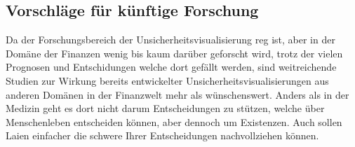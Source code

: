 \subsection{Vorschläge für künftige Forschung}

Da der Forschungsbereich der Unsicherheitsvisualisierung reg ist, aber in der Domäne der Finanzen wenig bis kaum darüber geforscht wird, trotz der vielen Prognosen und Entschidungen welche dort gefällt werden, sind weitreichende Studien zur Wirkung bereits entwickelter Unsicherheitsvisualisierungen aus anderen Domänen in der Finanzwelt mehr als wünschenswert.
Anders als in der Medizin geht es dort nicht darum Entscheidungen zu stützen, welche über Menschenleben entscheiden können, aber dennoch um Existenzen. Auch sollen Laien einfacher die schwere Ihrer Entscheidungen nachvollziehen können.
